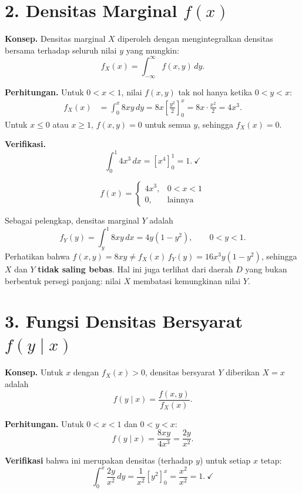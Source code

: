 \documentclass[11pt,a4paper]{article}
\begin{document}
\section*{2. Densitas Marginal $f(x)$}

\textbf{Konsep.} Densitas marginal $X$ diperoleh dengan mengintegralkan densitas bersama terhadap seluruh nilai $y$ yang mungkin:
\[
f_X(x)=\int_{-\infty}^{\infty} f(x,y)\,dy.
\]

\textbf{Perhitungan.} Untuk $0<x<1$, nilai $f(x,y)$ tak nol hanya ketika $0<y<x$:
\begin{align*}
f_X(x)
&= \int_0^x 8xy\,dy
 = 8x\left[\frac{y^2}{2}\right]_0^x
 = 8x\cdot\frac{x^2}{2}
 = 4x^3.
\end{align*}
Untuk $x\le 0$ atau $x\ge 1$, $f(x,y)=0$ untuk semua $y$, sehingga $f_X(x)=0$.

\textbf{Verifikasi.}
\[
\int_0^1 4x^3\,dx = \left[x^4\right]_0^1 = 1.\ \checkmark
\]

\begin{jawaban}
\[
f(x)=\begin{cases} 4x^3, & 0<x<1\\ 0, & \text{lainnya}\end{cases}
\]
\end{jawaban}

\begin{catatan}
Sebagai pelengkap, densitas marginal $Y$ adalah
\[
f_Y(y)=\int_y^1 8xy\,dx = 4y(1-y^2),\qquad 0<y<1.
\]
Perhatikan bahwa $f(x,y)=8xy \neq f_X(x)\,f_Y(y)=16x^3y(1-y^2)$, sehingga $X$ dan $Y$ \textbf{tidak saling bebas}. Hal ini juga terlihat dari daerah $D$ yang bukan berbentuk persegi panjang: nilai $X$ membatasi kemungkinan nilai $Y$.
\end{catatan}

\section*{3. Fungsi Densitas Bersyarat $f(y\mid x)$}

\textbf{Konsep.} Untuk $x$ dengan $f_X(x)>0$, densitas bersyarat $Y$ diberikan $X=x$ adalah
\[
f(y\mid x)=\frac{f(x,y)}{f_X(x)}.
\]

\textbf{Perhitungan.} Untuk $0<x<1$ dan $0<y<x$:
\[
f(y\mid x)=\frac{8xy}{4x^3}=\frac{2y}{x^2}.
\]

\textbf{Verifikasi} bahwa ini merupakan densitas (terhadap $y$) untuk setiap $x$ tetap:
\[
\int_0^x \frac{2y}{x^2}\,dy
= \frac{1}{x^2}\left[y^2\right]_0^x
= \frac{x^2}{x^2}=1.\ \checkmark
\]
\end{document}
